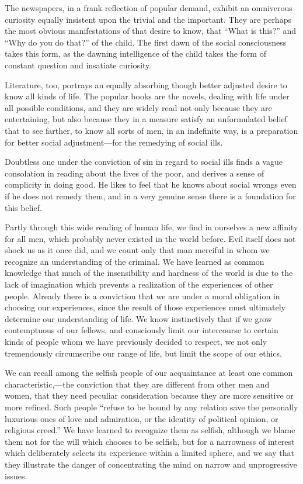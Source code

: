 \documentclass[]{article}
\begin{document}
\begin{sectionbody}
\addamsparagraph The newspapers, in a frank reflection of popular demand, exhibit an
omniverous curiosity equally insistent upon the trivial and the
important. They are perhaps the most obvious manifestations of that
desire to know, that ``What is this?'' and ``Why do you do that?'' of the
child. The first dawn of the social consciousness takes this form, as
the dawning intelligence of the child takes the form of constant
question and insatiate curiosity.

\addamsparagraph Literature, too, portrays an equally absorbing though better adjusted
desire to know all kinds of life. The popular books are the novels,
dealing with life under all possible conditions, and they are widely
read not only because they are entertaining, but also because they in a
measure satisfy an unformulated belief that to see farther, to know all
sorts of men, in an indefinite way, is a preparation for better social
adjustment---for the remedying of social ills.

\addamsparagraph Doubtless one under the conviction of sin in regard to social ills finds
a vague consolation in reading about the lives of the poor, and derives
a sense of complicity in doing good. He likes to feel that he knows
about social wrongs even if he does not remedy them, and in a very
genuine sense there is a foundation for this belief.

\addamsparagraph Partly through this wide reading of human life, we find in ourselves a
new affinity for all men, which probably never existed in the world
before. Evil itself does not shock us as it once did, and we count only
that man merciful in whom we recognize an understanding of the criminal.
We have learned as common knowledge that much of the insensibility and
hardness of the world is due to the lack of imagination which prevents a
realization of the experiences of other people. Already there is a
conviction that we are under a moral obligation in choosing our
experiences, since the result of those experiences must ultimately
determine our understanding of life. We know instinctively that if we
grow contemptuous of our fellows, and consciously limit our intercourse
to certain kinds of people whom we have previously decided to respect,
we not only tremendously circumscribe our range of life, but limit the
scope of our ethics.

\addamsparagraph We can recall among the selfish people of our acquaintance at least one
common characteristic,---the conviction that they are different from
other men and women, that they need peculiar consideration because they
are more sensitive or more refined. Such people ``refuse to be bound by
any relation save the personally luxurious ones of love and admiration,
or the identity of political opinion, or religious creed.'' We have
learned to recognize them as selfish, although we blame them not for the
will which chooses to be selfish, but for a narrowness of interest which
deliberately selects its experience within a limited sphere, and we say
that they illustrate the danger of concentrating the mind on narrow and
unprogressive issues.


\end{sectionbody}
\end{document}
